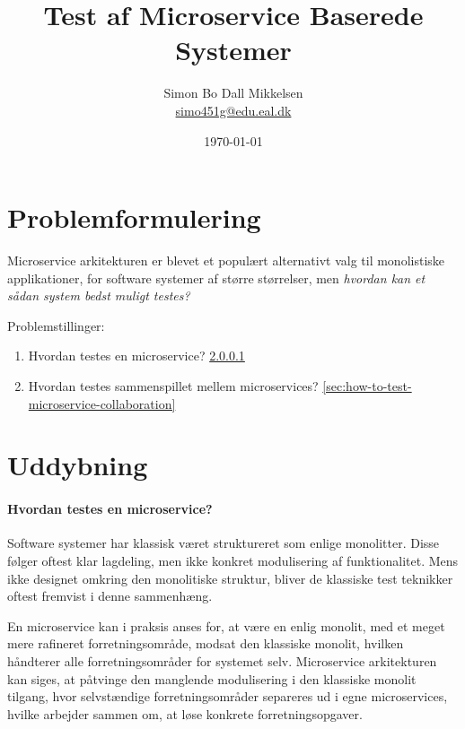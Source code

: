 \documentclass{article}
\begin{document}
\title{Test af Microservice Baserede Systemer}
\author{Simon Bo Dall Mikkelsen \\ \href{mailto:simo451g@edu.eal.dk}{simo451g@edu.eal.dk}}
\date{\today}

\maketitle
\thispagestyle{empty}
\newpage

\tableofcontents
\thispagestyle{empty}
\newpage

\section{Problemformulering}

Microservice arkitekturen er blevet et populært alternativt valg til monolistiske applikationer, for software systemer af større størrelser, men \emph{hvordan kan et sådan system bedst muligt testes?}

Problemstillinger:

\begin{enumerate}
    \item Hvordan testes en microservice? \ref{sec:how-to-test-a-microservice}
    \item Hvordan testes sammenspillet mellem microservices? \ref{sec:how-to-test-microservice-collaboration}
\end{enumerate}

\section{Uddybning}

\paragraph{Hvordan testes en microservice?}\label{sec:how-to-test-a-microservice}

Software systemer har klassisk været struktureret som enlige monolitter. Disse følger oftest klar lagdeling, men ikke konkret modulisering af funktionalitet. Mens ikke designet omkring den monolitiske struktur, bliver de klassiske test teknikker oftest fremvist i denne sammenhæng. 

En microservice kan i praksis anses for, at være en enlig monolit, med et meget mere rafineret forretningsområde, modsat den klassiske monolit, hvilken håndterer alle forretningsområder for systemet selv. Microservice arkitekturen kan siges, at påtvinge den manglende modulisering i den klassiske monolit tilgang, hvor selvstændige forretningsområder separeres ud i egne microservices, hvilke arbejder sammen om, at løse konkrete forretningsopgaver.
\end{document}

